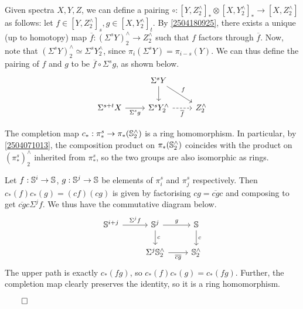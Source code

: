 \documentclass{MetricNotes2023}
\def\bb{\ensuremath\mathbb}
\def\done{\begin{flushright}\vspace{-4.35ex}\(\qed\)\end{flushright}}
\begin{document}
Given spectra \(X, Y, Z\), we can define a pairing \(\circ : [Y, Z^\wedge_2]_* \otimes [X,Y^\wedge_2]_* \to [X, Z^\wedge_2]\) as follows: let \(f \in [Y, Z^\wedge_2]_s, g \in [X, Y^\wedge_2]_t\). By \ref{2504180925}, there exists a unique (up to homotopy) map \(\overline f : (\Sigma^sY)^\wedge_2 \to Z^\wedge_2\) such that \(f\) factors through \(\overline f\). Now, note that \((\Sigma^sY)^\wedge_2 \simeq \Sigma^sY^\wedge_2\), since \(\pi_i(\Sigma^sY)=\pi_{i-s}(Y)\). We can thus define the pairing of \(f\) and \(g\) to be \(\overline f \circ \Sigma^s g\), as shown below. 
\[\begin{tikzcd}
 & \Sigma^sY \arrow[rd, "f"] \arrow[d, ""] & \\ 
 \Sigma^{s+t}X \arrow[r, swap, "\Sigma^sg"]  & \Sigma^sY^\wedge_2 \arrow[r, "\overline f"', dashrightarrow] & Z^\wedge_2 
 \end{tikzcd}\] 

\begin{lemma}
The completion map \(c_* : \pi_*^s \to \pi_*(\bb{S}^\wedge_2)\) is a ring homomorphism. In particular, by \ref{2504071013}, the composition product on \(\pi_*(\bb{S}^\wedge_2)\) coincides with the product on \((\pi_*^s)^\wedge_2\) inherited from \(\pi_*^s\), so the two groups are also isomorphic as rings. 
\end{lemma}

\begin{ourproof}
Let \(f : \bb{S}^i \to \bb{S}\), \(g : \bb{S}^j \to \bb{S}\) be elements of \(\pi_i^s\) and \(\pi_j^s\) respectively. Then \(c_*(f)c_*(g)=(cf)(cg)\) is given by factorising \(cg=\overline{cg}c\) and composing to get \(\overline{cg}c\Sigma^jf\). We thus have the commutative diagram below.
\[\begin{tikzcd}
\bb{S}^{i+j} \arrow[r, "\Sigma^j f"]  & \bb{S}^j \arrow[r, "g"] \arrow[d, "c"] & \bb{S} \arrow[d, "c"] \\ 
 & \Sigma^j \bb{S}^\wedge_2  \arrow[r, "\overline{cg}"'] & \bb{S}^\wedge_2 
 \end{tikzcd}\] 
The upper path is exactly \(c_*(fg)\), so \(c_*(f)c_*(g)=c_*(fg)\). Further, the completion map clearly preserves the identity, so it is a ring homomorphism.\done
\end{ourproof}
\end{document}
